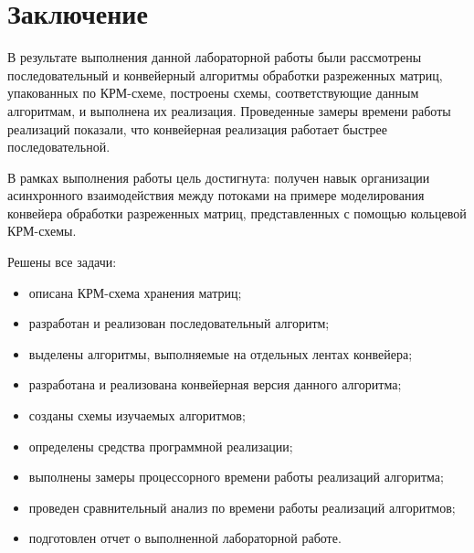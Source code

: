 \chapter*{Заключение}

В результате выполнения данной лабораторной работы были рассмотрены последовательный и конвейерный алгоритмы обработки разреженных матриц, упакованных по КРМ-схеме, построены схемы, соответствующие данным алгоритмам, и выполнена их реализация. Проведенные замеры времени работы реализаций показали, что конвейерная реализация работает быстрее последовательной.

В рамках выполнения работы цель достигнута: получен навык организации асинхронного взаимодействия между потоками на примере моделирования конвейера обработки разреженных матриц, представленных с помощью кольцевой КРМ-схемы.

Решены все задачи:
\begin{itemize}
	\item описана КРМ-схема хранения матриц;
	\item разработан и реализован последовательный алгоритм;
	\item выделены алгоритмы, выполняемые на отдельных лентах конвейера;
	\item разработана и реализована конвейерная версия данного алгоритма;
	\item созданы схемы изучаемых алгоритмов;
	\item определены средства программной реализации;
	\item выполнены замеры процессорного времени работы реализаций алгоритма;
	\item проведен сравнительный анализ по времени работы реализаций алгоритмов;
	\item подготовлен отчет о выполненной лабораторной работе.
\end{itemize}